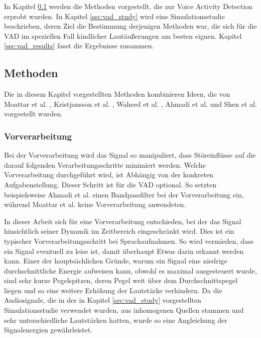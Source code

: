 In Kapitel \ref{sec:methods_vad_new} werden die Methoden vorgestellt, die zur Voice Activity Detection erprobt wurden. In Kapitel \ref{sec:vad_study} wird eine Simulationsstudie beschrieben, deren Ziel die Bestimmung derjenigen Methoden war, die sich für die VAD im speziellen Fall kindlicher Lautäußerungen am besten eignen. Kapitel \ref{sec:vad_results} fasst die Ergebnisse zusammen.

\subsection{Methoden}
\label{sec:methods_vad_new}

Die in diesem Kapitel vorgestellten Methoden kombinieren Ideen, die von Moattar et al. \cite{vad_Easy}, Kristjansson et al. \cite{vad_Lisboa}, Waheed et al. \cite{vad_entropy}, Ahmadi et al. \cite{vad_ceps} und Shen et al.\cite{vad_entropie02} vorgestellt wurden.

\subsubsection{Vorverarbeitung}
\label{sec:preprocessing}

Bei der Vorverarbeitung wird das Signal so manipuliert, dass Störeinflüsse auf die darauf folgenden Verarbeitungsschritte minimiert werden. Welche Vorverarbeitung durchgeführt wird, ist Abhängig von der konkreten Aufgabenstellung. Dieser Schritt ist für die VAD optional. So setzten beispielsweise Ahmadi et al. \cite{vad_ceps} einen Bandpassfilter bei der Vorverarbeitung ein, während Moattar et al. \cite{vad_Easy} keine Vorverarbeitung anwendeten. 

In dieser Arbeit sich für eine Vorverarbeitung entschieden, bei der das Signal hinsichtlich seiner Dynamik im Zeitbereich eingeschränkt wird. Dies ist ein typischer Vorverarbeitungsschritt bei Sprachaufnahmen. So wird vermieden, dass ein Signal eventuell zu leise ist, damit überhaupt Etwas darin erkannt werden kann. Einer der hauptsächlichen Gründe, warum ein Signal eine niedrige durchschnittliche Energie aufweisen kann, obwohl es maximal ausgesteuert wurde, sind sehr kurze Pegelspitzen, deren Pegel weit über dem Durchschnittspegel liegen und so eine weitere Erhöhung der Lautstärke verhindern. Da die Audiosignale, die in der in Kapitel \ref{sec:vad_study} vorgestellten Simulationsstudie verwendet wurden, aus inhomogenen Quellen stammen und sehr unterschiedliche Lautstärken hatten, wurde so eine Angleichung der Signalenergien gewährleistet.

